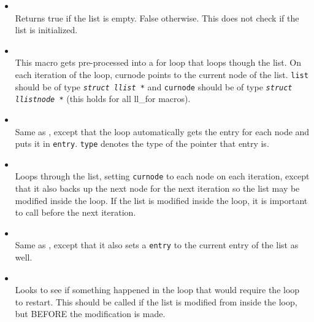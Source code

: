 \begin{itemize}
\item {} \\
Returns true if the list is empty. False otherwise. This does not check if the list is initialized.

\item {} \\
This macro gets pre-processed into a for loop that loops though the list. On each iteration of the loop,
curnode points to the current node of the list. \texttt{list} should be of type \texttt{\textit{struct llist *}}
and \texttt{curnode} should be of type \texttt{\textit{struct llistnode *}} (this holds for all ll\_for macros).

\item {} \\
Same as , except that the loop automatically gets the entry
for each node and puts it in \texttt{entry}. \texttt{type} denotes the type of the
pointer that entry is.

\item {} \\
Loops through the list, setting \texttt{curnode} to each node on each iteration, except that it
also backs up the next node for the next iteration so the list may be modified inside the loop.
If the list is modified inside the loop, it is important to call  before
the next iteration.

\item {} \\
Same as , except that it also sets a \texttt{entry} to the
current entry of the list as well.

\item {} \\
Looks to see if something happened in the loop that would require the loop to restart. This should be
called if the list is modified from inside the loop, but BEFORE the modification is made.
\end{itemize}

